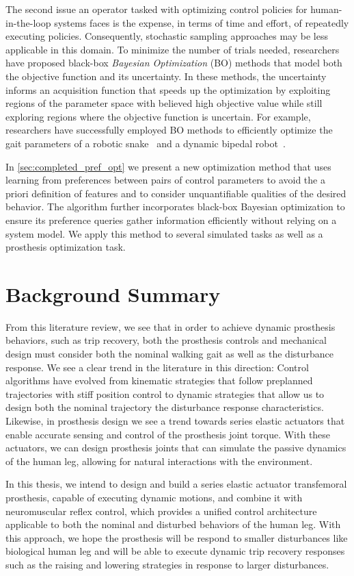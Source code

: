 The second issue an operator tasked with optimizing control policies for
human-in-the-loop systems faces is the expense, in terms of time and effort, of
repeatedly executing policies. Consequently, stochastic sampling approaches may
be less applicable in this domain. To minimize the number of trials needed,
researchers have proposed black-box \emph{Bayesian Optimization} (BO) methods
that model both the objective function and its uncertainty. In these methods,
the uncertainty informs an acquisition function that speeds up the optimization
by exploiting regions of the parameter space with believed high objective value
while still exploring regions where the objective function is uncertain. For
example, researchers have successfully employed BO methods to efficiently
optimize the gait parameters of a robotic snake~\citep{tesch2011using} and a
dynamic bipedal robot~\citep{calandra2014bayesian}.

In \cref{sec:completed_pref_opt} we present a new optimization method that uses
learning from preferences between pairs of control parameters to avoid the a
priori definition of features and to consider unquantifiable qualities of the
desired behavior. The algorithm further incorporates black-box Bayesian
optimization to ensure its preference queries gather information efficiently
without relying on a system model. We apply this method to several simulated
tasks as well as a prosthesis optimization task.

\section{Background Summary}
From this literature review, we see that in order to achieve dynamic prosthesis
behaviors, such as trip recovery, both the prosthesis controls and mechanical
design must consider both the nominal walking gait as well as the disturbance
response.  We see a clear trend in the literature in this direction: Control
algorithms have evolved from kinematic strategies that follow preplanned
trajectories with stiff position control to dynamic strategies that allow us to
design both the nominal trajectory the disturbance response characteristics.
Likewise, in prosthesis design we see a trend towards series elastic actuators
that enable accurate sensing and control of the prosthesis joint torque. With
these actuators, we can design prosthesis joints that can simulate the passive
dynamics of the human leg, allowing for natural interactions with the
environment. 

In this thesis, we intend to design and build a series elastic actuator
transfemoral prosthesis, capable of executing dynamic motions, and combine it
with neuromuscular reflex control, which provides a unified control architecture
applicable to both the nominal and disturbed behaviors of the human leg. With
this approach, we hope the prosthesis will be respond to smaller disturbances
like biological human leg and will be able to execute dynamic trip recovery
responses such as the raising and lowering strategies in response to larger
disturbances.

